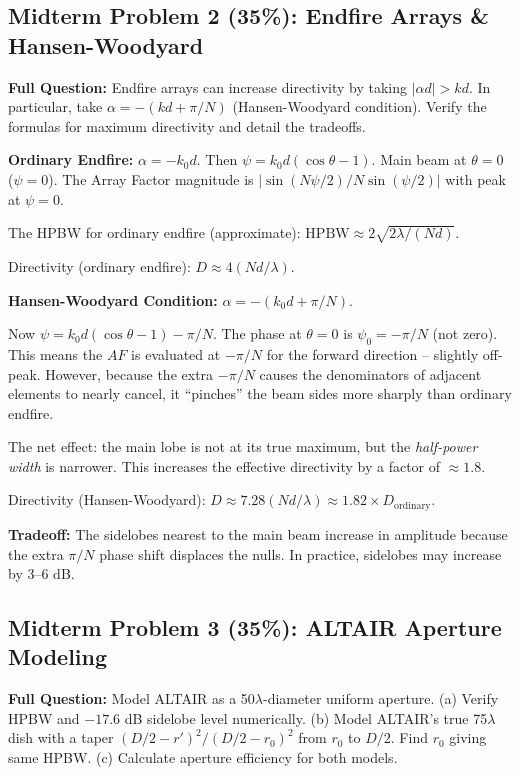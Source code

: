 \documentclass[10pt,letterpaper]{article}
\begin{document}
\subsection{Midterm Problem 2 (35\%): Endfire Arrays \& Hansen-Woodyard}

\textbf{Full Question:} Endfire arrays can increase directivity by taking $|\alpha d| > kd$. In particular, take $\alpha = -(kd+\pi/N)$ (Hansen-Woodyard condition). Verify the formulas for maximum directivity and detail the tradeoffs.

\begin{tcolorbox}[examplebox, title={Full Solution}]
\textbf{Ordinary Endfire:} $\alpha = -k_0 d$. Then $\psi = k_0 d(\cos\theta - 1)$. Main beam at $\theta=0$ ($\psi=0$). The Array Factor magnitude is $|\sin(N\psi/2)/N\sin(\psi/2)|$ with peak at $\psi=0$.

The HPBW for ordinary endfire (approximate): $\mathrm{HPBW}\approx 2\sqrt{2\lambda/(Nd)}$.

Directivity (ordinary endfire): $D\approx 4(Nd/\lambda)$.

\textbf{Hansen-Woodyard Condition:} $\alpha = -(k_0 d + \pi/N)$.

Now $\psi = k_0 d(\cos\theta - 1) - \pi/N$. The phase at $\theta=0$ is $\psi_0 = -\pi/N$ (not zero). This means the $AF$ is evaluated at $-\pi/N$ for the forward direction -- slightly off-peak. However, because the extra $-\pi/N$ causes the denominators of adjacent elements to nearly cancel, it ``pinches'' the beam sides more sharply than ordinary endfire.

The net effect: the main lobe is not at its true maximum, but the \emph{half-power width} is narrower. This increases the effective directivity by a factor of $\approx1.8$.

Directivity (Hansen-Woodyard): $D\approx 7.28(Nd/\lambda) \approx 1.82\times D_\mathrm{ordinary}$.

\textbf{Tradeoff:} The sidelobes nearest to the main beam increase in amplitude because the extra $\pi/N$ phase shift displaces the nulls. In practice, sidelobes may increase by 3--6 dB.
\end{tcolorbox}

\subsection{Midterm Problem 3 (35\%): ALTAIR Aperture Modeling}

\textbf{Full Question:} Model ALTAIR as a 50$\lambda$-diameter uniform aperture. (a) Verify HPBW and $-17.6$ dB sidelobe level numerically. (b) Model ALTAIR's true 75$\lambda$ dish with a taper $(D/2-r')^2/(D/2-r_0)^2$ from $r_0$ to $D/2$. Find $r_0$ giving same HPBW. (c) Calculate aperture efficiency for both models.
\end{document}
